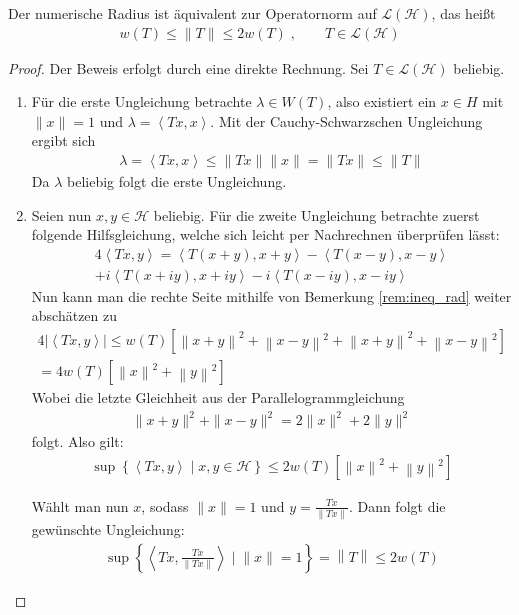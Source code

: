 \begin{thm}[Normäquivalenz] \label{thm:norm_equiv}
	Der numerische Radius ist äquivalent zur Operatornorm auf $\mathcal{L}(\mathcal{H})$, das heißt 
	\begin{align*}
		w(T) \le \| T\| \le 2w(T) \; ,\qquad T \in \mathcal{L}\mathcal{(H)}
	\end{align*}
\end{thm}
\begin{proof}
	Der Beweis erfolgt durch eine direkte Rechnung. Sei $T \in \mathcal{L(H)}$ beliebig.
	\begin{enumerate}[label=\protect\circled{\arabic{*}}]
		\item Für die erste Ungleichung betrachte $\lambda \in W(T)$, also existiert ein $x \in H$ mit $\|x\|=1$ und $\lambda = \left<Tx,x \right>$. Mit der Cauchy-Schwarzschen Ungleichung ergibt sich
		\begin{align*}
			\lambda = \left<Tx,x \right> \le \|Tx\| \|x\| = \|Tx\| \le \|T\| 
		\end{align*} 
		Da $\lambda$ beliebig folgt die erste Ungleichung.
		\item Seien nun $x,y \in \mathcal{H}$ beliebig. Für die zweite Ungleichung betrachte zuerst folgende Hilfsgleichung, welche sich leicht per Nachrechnen überprüfen lässt:
		\begin{align}
			4 \left< Tx,y\right> = \left< T(x+y),x+y\right> - \left< T(x-y),x-y\right> \nonumber \\ + i\left< T(x+iy),x+iy\right> - i\left< T(x-iy),x-iy\right> 
		\end{align}
		Nun kann man die rechte Seite mithilfe von Bemerkung \ref{rem:ineq_rad} weiter abschätzen zu
		\begin{align}
			4 \left|\left< Tx,y\right>\right| \le w(T) \left[ \left\| x+y \right\|^2 + \left\| x-y \right\|^2 + \left\| x+y \right\|^2 + \left\| x-y \right\|^2 \right] \nonumber \\
			=  4 w(T) \left[ \left\| x \right\|^2 + \left\| y \right\|^2  \right]
		\end{align}
		Wobei die letzte Gleichheit aus der Parallelogrammgleichung
		\begin{align}
			\| x+y \|^2 + \| x-y \|^2 = 2\| x\|^2 + 2\| y\|^2
		\end{align}
		folgt.
		Also gilt:
		\begin{align}
			\sup\left\{ \left< Tx, y \right> \; | \; x,y \in \mathcal{H} \right\} \le 2 w(T) \left[ \left\| x \right\|^2 + \left\| y \right\|^2  \right]
		\end{align}
		
		Wählt man nun $x$, sodass $\|x\|=1$ und $y = \frac{Tx}{\|Tx\|}$. Dann folgt die gewünschte Ungleichung:
		\begin{align}
			\sup\left\{ \left< Tx, \frac{Tx}{\|Tx\|} \right> \; | \; \|x\|=1 \right\} = \left\| T \right\| \le 2 w(T)
		\end{align} \qedhere
	\end{enumerate}
\end{proof}

